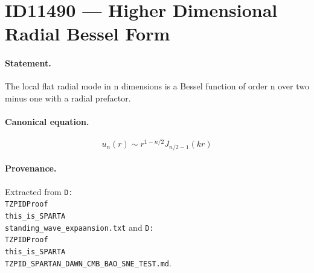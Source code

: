 \section*{ID11490 --- Higher Dimensional Radial Bessel Form}

\paragraph{Statement.}
The local flat radial mode in n dimensions is a Bessel function of order n over two minus one with a radial prefactor.

\paragraph{Canonical equation.}
\[
u_n(r)\sim r^{1-n/2}J_{n/2-1}(kr)
\]

\paragraph{Provenance.}
Extracted from \texttt{D:\\TZPIDProof\\this\_is\_SPARTA\\standing\_wave\_expaansion.txt} and \texttt{D:\\TZPIDProof\\this\_is\_SPARTA\\TZPID\_SPARTAN\_DAWN\_CMB\_BAO\_SNE\_TEST.md}.
